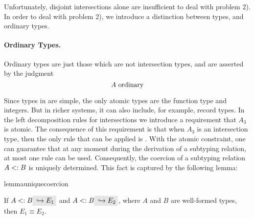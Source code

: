 Unfortunately, disjoint intersections alone are insufficient to deal with
problem 2). In order to deal with problem 2), we introduce a distinction between
types, and ordinary types.

\paragraph{Ordinary Types.} Ordinary types are just those which are not intersection
types, and are asserted by the judgment \[ A \ \textnormal{ordinary} \]

Since types in \name are simple, the only atomic types are the
function type and integers.
But in richer systems, it can also include, for example, record types.
In the left decomposition rules for intersections we introduce a requirement
that $A_3$ is atomic. The consequence of this requirement is that when $A_3$ is
an intersection type, then the only rule that can be applied is
. With the atomic constraint, one can guarantee that at
any moment during the derivation of a subtyping relation, at most one rule can
be used. Consequently, the coercion of a subtyping relation $A <: B$ is
uniquely determined. This fact is captured by the following lemma:

\begin{restatable}{lemma}{uniquecoercion}
  \label{lemma:unique-coercion}

  If $A \subtype B \yields {E_1}$ and $A \subtype B \yields {E_2}$, where $A$
  and $B$ are well-formed types, then $E_1 \equiv E_2$.
\end{restatable}


